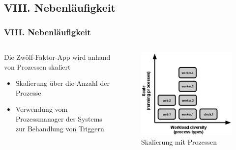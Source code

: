 \documentclass{beamer}
\begin{document}
			\subsection{VIII. Nebenläufigkeit}
				\begin{frame}
					\frametitle{VIII. Nebenläufigkeit}
					\begin{columns}
							\begin{block}{Die Zwölf-Faktor-App wird anhand von Prozessen skaliert}
						\begin{itemize}
							\item Skalierung über die Anzahl der Prozesse
							\item Verwendung vom Prozessmanager des Systems zur Behandlung \newline von Triggern
						\end{itemize}
					\end{block}
					\begin{figure}[htpb]
						\centering
						\includegraphics[width=\textwidth]{process-types.png}
						\caption{Skalierung mit Prozessen \cite{factor-concurrency}}
					\end{figure}
					\end{columns}
				\end{frame}
\end{document}
